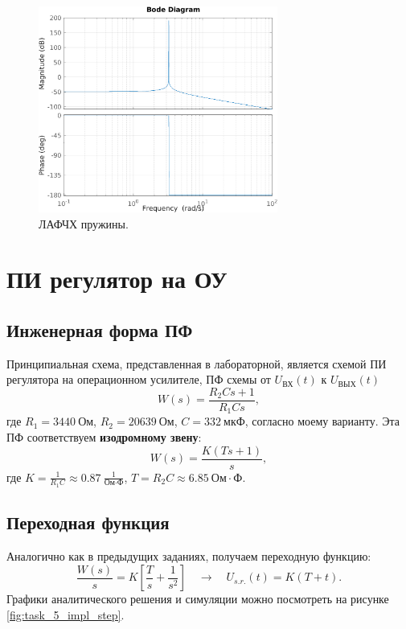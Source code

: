 \begin{figure}[H]
    \centering
    \includegraphics[width=0.7\textwidth]{figs/task_4_ЛАФЧХ.png}
    \caption{ЛАФЧХ пружины.}
    \label{fig:task_4_ЛАФЧХ}
\end{figure}


\section{ПИ регулятор на ОУ}

\subsection{Инженерная форма ПФ}

Принципиальная схема, представленная в лабораторной, является схемой ПИ регулятора на
операционном усилителе, ПФ схемы от $U_\text{ВХ}(t)$ к $U_\text{ВЫХ}(t)$
\begin{equation*}
    W(s)=\frac{R_2Cs+1}{R_1Cs},
\end{equation*}
где $R_1=3440\ \text{Ом}$, $R_2=20639\ \text{Ом}$, $C=332\ \text{мкФ}$,
согласно моему варианту. Эта ПФ соответствуем \textbf{изодромному звену}:
\begin{equation*}
    W(s)=\frac{K(Ts+1)}{s},
\end{equation*}
где $K=\frac{1}{R_1C}\approx0.87\ \frac{1}{\text{Ом}\cdot\text{Ф}}$,
$T=R_2C\approx6.85\ \text{Ом}\cdot\text{Ф}$.

\subsection{Переходная функция}

Аналогично как в предыдущих заданиях, получаем переходную функцию:
\begin{equation*}
    \frac{W(s)}{s}=K\left[ \frac{T}{s}+\frac{1}{s^2} \right] \quad\rightarrow\quad
    U_{s.r.}(t)=K(T+t).
\end{equation*}
Графики аналитического решения и симуляции можно посмотреть на рисунке \ref{fig:task_5_impl_step}.

